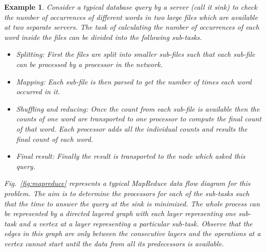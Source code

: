 \documentclass[journal]{IEEEtran}
\newtheorem{example}{{\bf Example}}
\begin{document}
\begin{example}
  \label{ex:mapreduce}
  Consider a typical database query by a server (call it sink) to
  check the number of occurrences of different words in two large
  files which are available at two separate servers. The
  task of calculating the number of occurrences of each word inside
  the files can be divided into the following sub-tasks.
\begin{itemize}
  \item \textit{Splitting:} First the files are split into smaller
    sub-files such that each sub-file can be processed by a processor
    in the network.
  \item \textit{Mapping:} Each sub-file is then parsed to get the
    number of times each word occurred in it.
  \item \textit{Shuffling and reducing:} Once the count from each
    sub-file is available then the counts of one word are transported
    to one processor to compute the final count of that word. Each
    processor adds all the individual counts and results the final
    count of each word.
   \item \textit{Final result:} Finally the result is transported to
    the node which asked this query.
  \end{itemize}
Fig.~\ref{fig:mapreduce} represents a typical MapReduce data flow
  diagram for this problem. The aim is to determine the processors for
  each of the sub-tasks such that the time to answer the query at the
  sink is minimized. The whole process can be represented by a
  directed layered graph with each layer representing one sub-task and
  a vertex at a layer representing a particular sub-task. Observe that
  the edges in this graph are only between the consecutive layers and
  the operations at a vertex cannot start until the data from all its
  predecessors is available.
\begin{figure}[tbp]
    \centering
{}
\end{figure}
\end{example}
\end{document}
